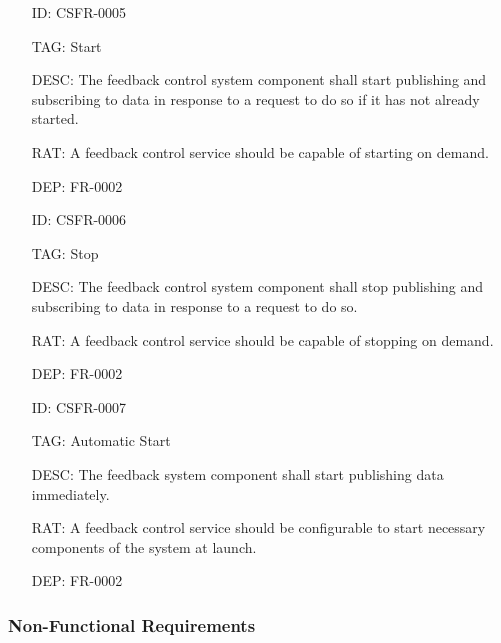         \begin{itemize}
          \setlength{\itemindent}{.5in}
          \itemsep .15em
          \item[ID:] CSFR-0005
          \item[TAG:] Start
          \item[DESC:] The feedback control system component shall start
            publishing and subscribing to data in response to a request to do
            so if it has not already started.
          \item[RAT:] A feedback control service should be capable of starting
            on demand.
          \item[DEP:] FR-0002
        \end{itemize}

        \begin{itemize}
          \setlength{\itemindent}{.5in}
          \itemsep .15em
          \item[ID:] CSFR-0006
          \item[TAG:] Stop
          \item[DESC:] The feedback control system component shall stop
            publishing and subscribing to data in response to a request to do
            so.
          \item[RAT:] A feedback control service should be capable of stopping
            on demand.
          \item[DEP:] FR-0002
        \end{itemize}

        \begin{itemize}
          \setlength{\itemindent}{.5in}
          \itemsep .15em
          \item[ID:] CSFR-0007
          \item[TAG:] Automatic Start
          \item[DESC:] The feedback system component shall start
            publishing data immediately.
          \item[RAT:] A feedback control service should be configurable to start
            necessary components of the system at launch.
          \item[DEP:] FR-0002
        \end{itemize}

    \subsubsection{Non-Functional Requirements}\label{sec:req-srs-non-func}


